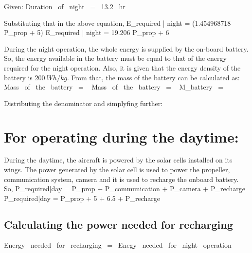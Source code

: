 Given:
\mb Duration \ of \ night \ = \ 13.2 \ hr \me

Substituting that in the above equation,
\mb E_{required | night} = (1.454968718 \cdot P_{prop} + 5)  \quad [Whr] \me
\mb E_{required | night} = 19.206 \cdot P_{prop} + 6 \quad [Whr] \me

\p During the night operation, the whole energy is supplied by the on-board battery. So, the energy available in the battery must be equal to that of the energy required for the night operation. Also, it is given that the energy density of the battery is $ 200 \ Wh/kg $. From that, the mass of the battery can be calculated as:
\mb Mass \ of \ the \ battery \ = \  \me
\mb Mass \ of \ the \ battery \ = \  \me
\mb M_{battery} \ = \  \me

Distributing the denominator and simplyfing further:

\section{For operating during the daytime:}

\p During the daytime, the aircraft is powered by the solar cells installed on its wings. The power generated by the solar cell is used to power the propeller, communication system, camera and it is used to recharge the onboard battery. \\
\p So,
\mb P_{required|day} = P_{prop} \cdot {} \cdot {} + P_{communication} + P_{camera} + P_{recharge} \me
\mb P_{required|day} = P_{prop} \cdot {} \cdot {} + 5 + 6.5 + P_{recharge} \quad [W] \me


\subsection{Calculating the power needed for recharging}
\vspace{0.2cm}

\mb Energy \ needed \ for \ recharging \ = \ Enegy \ needed \ for \ night \ operation \me


